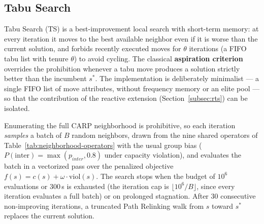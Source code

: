\subsection{Tabu Search}
\label{subsec:ts}

Tabu Search (TS) is a best-improvement local search with short-term memory:
at every iteration it moves to the best available neighbor even if it is
worse than the current solution, and forbids recently executed moves for
$\theta$ iterations (a FIFO tabu list with tenure $\theta$) to avoid cycling.
The classical \textbf{aspiration criterion} overrides the prohibition
whenever a tabu move produces a solution strictly better than the incumbent
$s^{*}$. The implementation is deliberately minimalist --- a single FIFO
list of move attributes, without frequency memory or an elite pool --- so
that the contribution of the reactive extension
(Section~\ref{subsec:rts}) can be isolated.

Enumerating the full CARP neighborhood is prohibitive, so each iteration
\emph{samples} a batch of $B$ random neighbors, drawn from the nine shared
operators of Table~\ref{tab:neighborhood-operators} with the usual group
bias ($P(\text{inter}) = \max(p_{inter}, 0.8)$ under capacity violation),
and evaluates the batch in a vectorized pass over the penalized objective
$f(s) = c(s) + \omega \cdot \mathrm{viol}(s)$. The search stops when the
budget of $10^6$ evaluations or 300\,s is exhausted (the iteration cap is
$\lfloor 10^6 / B \rfloor$, since every iteration evaluates a full batch)
or on prolonged stagnation. After 30 consecutive non-improving iterations,
a truncated Path Relinking walk from $s$ toward $s^{*}$ replaces the
current solution.

